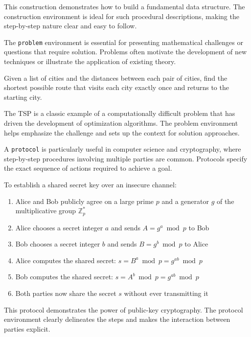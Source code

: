 \documentclass[9pt]{amsart}
\begin{document}
This construction demonstrates how to build a fundamental data structure. The
construction environment is ideal for such procedural descriptions, making the
step-by-step nature clear and easy to follow.

The \texttt{problem} environment is essential for presenting mathematical
challenges or questions that require solution. Problems often motivate the
development of new techniques or illustrate the application of existing theory.

\begin{problem}
Given a list of cities and the distances between each pair of cities, find the shortest possible route that visits each city exactly once and returns to the starting city.
\end{problem}

The TSP is a classic example of a computationally difficult problem that has
driven the development of optimization algorithms. The problem environment
helps emphasize the challenge and sets up the context for solution approaches.

A \texttt{protocol} is particularly useful in computer science and
cryptography, where step-by-step procedures involving multiple parties are
common. Protocols specify the exact sequence of actions required to achieve a
goal.

\begin{protocol}
    To establish a shared secret key over an insecure channel:
    \begin{enumerate}
        \item Alice and Bob publicly agree on a large prime $p$ and a generator $g$ of the
              multiplicative group $\mathbb{Z}_p^*$
        \item Alice chooses a secret integer $a$ and sends $A = g^a \bmod p$ to Bob
        \item Bob chooses a secret integer $b$ and sends $B = g^b \bmod p$ to Alice
        \item Alice computes the shared secret: $s = B^a \bmod p = g^{ab} \bmod p$
        \item Bob computes the shared secret: $s = A^b \bmod p = g^{ab} \bmod p$
        \item Both parties now share the secret $s$ without ever transmitting it
    \end{enumerate}
\end{protocol}

This protocol demonstrates the power of public-key cryptography. The protocol
environment clearly delineates the steps and makes the interaction between
parties explicit.
\end{document}
